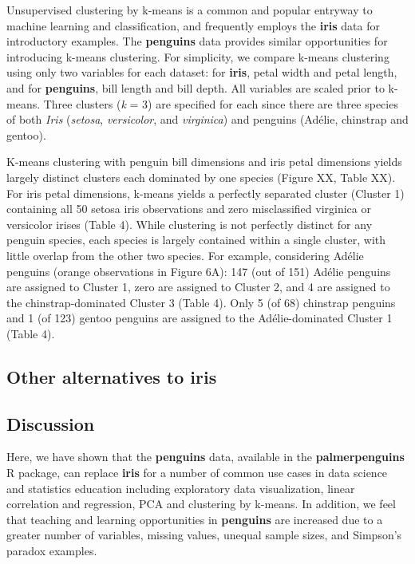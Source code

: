 Unsupervised clustering by k-means is a common and popular entryway to
machine learning and classification, and frequently employs the
\textbf{iris} data for introductory examples. The \textbf{penguins} data
provides similar opportunities for introducing k-means clustering. For
simplicity, we compare k-means clustering using only two variables for
each dataset: for \textbf{iris}, petal width and petal length, and for
\textbf{penguins}, bill length and bill depth. All variables are scaled
prior to k-means. Three clusters (\emph{k} = 3) are specified for each
since there are three species of both \emph{Iris} (\emph{setosa},
\emph{versicolor}, and \emph{virginica}) and penguins (Adélie, chinstrap
and gentoo).

K-means clustering with penguin bill dimensions and iris petal
dimensions yields largely distinct clusters each dominated by one
species (Figure XX, Table XX). For iris petal dimensions, k-means yields
a perfectly separated cluster (Cluster 1) containing all 50 setosa iris
observations and zero misclassified virginica or versicolor irises
(Table 4). While clustering is not perfectly distinct for any penguin
species, each species is largely contained within a single cluster, with
little overlap from the other two species. For example, considering
Adélie penguins (orange observations in Figure 6A): 147 (out of 151)
Adélie penguins are assigned to Cluster 1, zero are assigned to Cluster
2, and 4 are assigned to the chinstrap-dominated Cluster 3 (Table 4).
Only 5 (of 68) chinstrap penguins and 1 (of 123) gentoo penguins are
assigned to the Adélie-dominated Cluster 1 (Table 4).

\hypertarget{other-alternatives-to-iris}{%
\subsection{Other alternatives to
iris}\label{other-alternatives-to-iris}}

\hypertarget{discussion}{%
\subsection{Discussion}\label{discussion}}

Here, we have shown that the \textbf{penguins} data, available in the
\textbf{palmerpenguins} R package, can replace \textbf{iris} for a
number of common use cases in data science and statistics education
including exploratory data visualization, linear correlation and
regression, PCA and clustering by k-means. In addition, we feel that
teaching and learning opportunities in \textbf{penguins} are increased
due to a greater number of variables, missing values, unequal sample
sizes, and Simpson's paradox examples.

